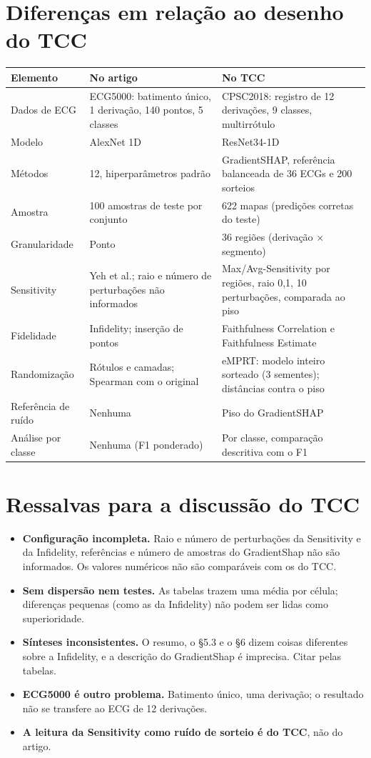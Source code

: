 \documentclass[11pt,a4paper]{article}
\begin{document}
\section{Diferenças em relação ao desenho do TCC}
\begin{center}\small
\begin{tabularx}{\linewidth}{lXX}
\toprule
\textbf{Elemento} & \textbf{No artigo} & \textbf{No TCC} \\
\midrule
Dados de ECG & ECG5000: batimento único, 1 derivação, 140 pontos, 5 classes & CPSC2018: registro de 12 derivações, 9 classes, multirrótulo \\
Modelo & AlexNet 1D & ResNet34-1D \\
Métodos & 12, hiperparâmetros padrão & GradientSHAP, referência balanceada de 36 ECGs e 200 sorteios \\
Amostra & 100 amostras de teste por conjunto & 622 mapas (predições corretas do teste) \\
Granularidade & Ponto & 36 regiões (derivação $\times$ segmento) \\
Sensitivity & Yeh et al.; raio e número de perturbações não informados & Max/Avg-Sensitivity por regiões, raio 0,1, 10 perturbações, comparada ao piso \\
Fidelidade & Infidelity; inserção de pontos & Faithfulness Correlation e Faithfulness Estimate \\
Randomização & Rótulos e camadas; Spearman com o original & eMPRT: modelo inteiro sorteado (3 sementes); distâncias contra o piso \\
Referência de ruído & Nenhuma & Piso do GradientSHAP \\
Análise por classe & Nenhuma (F1 ponderado) & Por classe, comparação descritiva com o F1 \\
\bottomrule
\end{tabularx}
\end{center}

\section{Ressalvas para a discussão do TCC}
\begin{itemize}
\item \textbf{Configuração incompleta.} Raio e número de perturbações da Sensitivity e da Infidelity, referências e número de amostras do GradientShap não são informados. Os valores numéricos não são comparáveis com os do TCC.
\item \textbf{Sem dispersão nem testes.} As tabelas trazem uma média por célula; diferenças pequenas (como as da Infidelity) não podem ser lidas como superioridade.
\item \textbf{Sínteses inconsistentes.} O resumo, o §5.3 e o §6 dizem coisas diferentes sobre a Infidelity, e a descrição do GradientShap é imprecisa. Citar pelas tabelas.
\item \textbf{ECG5000 é outro problema.} Batimento único, uma derivação; o resultado não se transfere ao ECG de 12 derivações.
\item \textbf{A leitura da Sensitivity como ruído de sorteio é do TCC}, não do artigo.
\end{itemize}
\end{document}
